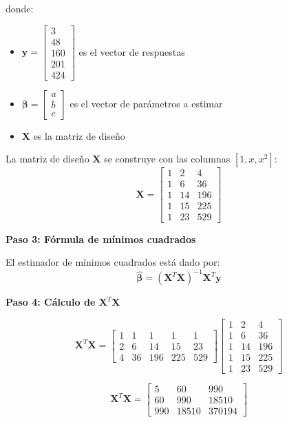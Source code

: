 \documentclass[11pt,a4paper]{article}
\begin{document}
donde:
\begin{itemize}
    \item $\mathbf{y} = \begin{bmatrix} 3 \\ 48 \\ 160 \\ 201 \\ 424 \end{bmatrix}$ es el vector de respuestas
    \item $\boldsymbol{\beta} = \begin{bmatrix} a \\ b \\ c \end{bmatrix}$ es el vector de parámetros a estimar
    \item $\mathbf{X}$ es la matriz de diseño
\end{itemize}

La matriz de diseño $\mathbf{X}$ se construye con las columnas $[1, x, x^2]$:
\[
\mathbf{X} = \begin{bmatrix}
1 & 2 & 4 \\
1 & 6 & 36 \\
1 & 14 & 196 \\
1 & 15 & 225 \\
1 & 23 & 529
\end{bmatrix}
\]

\textbf{Paso 3: Fórmula de mínimos cuadrados}

El estimador de mínimos cuadrados está dado por:
\[
\hat{\boldsymbol{\beta}} = (\mathbf{X}^T\mathbf{X})^{-1}\mathbf{X}^T\mathbf{y}
\]

\textbf{Paso 4: Cálculo de $\mathbf{X}^T\mathbf{X}$}

\[
\mathbf{X}^T\mathbf{X} = \begin{bmatrix}
    1 & 1 & 1 & 1 & 1 \\
    2 & 6 & 14 & 15 & 23 \\
    4 & 36 & 196 & 225 & 529
\end{bmatrix}
\begin{bmatrix}
    1 & 2 & 4 \\
    1 & 6 & 36 \\
    1 & 14 & 196 \\
    1 & 15 & 225 \\
    1 & 23 & 529
\end{bmatrix}
\]

\[
\mathbf{X}^T\mathbf{X} = \begin{bmatrix}
5 & 60 & 990 \\
60 & 990 & 18510 \\
990 & 18510 & 370194
\end{bmatrix}
\]
\end{document}
